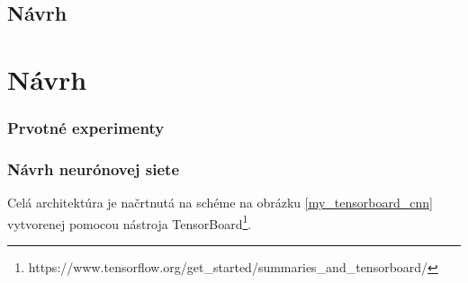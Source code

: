 \newpage
{}
{
	\section{Návrh}
}
{
	\chapter{Návrh}
}

\subsection{Prvotné experimenty}

\subsection{Návrh neurónovej siete}
\label{navrh}
\iffalse
K predikcii pohľadov na webové stránky je vhodné použiť konvolučnú neurónovú sieť, keďže webstránky sú vo forme obrázkov. Neurónová sieť bude predikovať priamo výslednú teplotnú mapu pohľadov (mapu výraznosti). Sieť by mala pozostávať z konvolučnej a združovacej vrstvy (vrstiev) pre spracovanie obrázku, nasledovaných normalizačnou vrstvou, plne prepojenou vrstvou a vrstvou výpadku (z angl. dropout layer). Za nimi nasleduje už len výstupná vrstva. Ako aktivačnú funkciu sme vybrali sigmoid, nakoľko sa bude predikovať mapa výraznosti, t. j. v podstate pravdepodobnosť pohľadu. 
\fi 
Celá architektúra je načrtnutá na schéme na obrázku \ref{my_tensorboard_cnn} vytvorenej pomocou nástroja  TensorBoard\footnote{https://www.tensorflow.org/get\_started/summaries\_and\_tensorboard/}.


